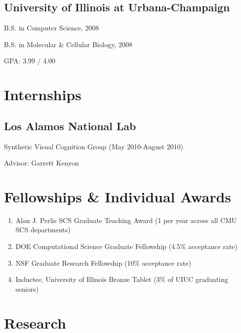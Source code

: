 \documentclass[10pt,letterpaper]{article}
\renewenvironment{itemize}{
  \begin{list}{}{
    \setlength{\leftmargin}{1.25em}
    \setlength{\itemsep}{0.25em}
    \setlength{\parskip}{0pt}
    \setlength{\parsep}{0.2em}
  }
}{
  \end{list}
}
\begin{document}
\subsection*{University of Illinois at Urbana-Champaign}
\begin{itemize}
  \item B.S. in Computer Science, 2008
  \item B.S. in Molecular \& Cellular Biology, 2008
  \item GPA: 3.99 / 4.00
\end{itemize}


\section*{Internships}
\subsection*{Los Alamos National Lab}
  \begin{itemize}
    \item Synthetic Visual Cognition Group (May 2010-August 2010)
    \item Advisor: Garrett Kenyon
  \end{itemize}

  \section*{Fellowships \& Individual Awards}
\begin{enumerate}
  \item {Alan J. Perlis SCS Graduate Teaching Award} (1 per year across all CMU SCS departments)%
  \item DOE Computational Science Graduate Fellowship (4.5\% acceptance rate)
  \item NSF Graduate Research Fellowship (10\% acceptance rate)
  \item Inductee, University of Illinois Bronze Tablet (3\% of UIUC graduating seniors)
\end{enumerate}

\section*{Research}
\end{document}
